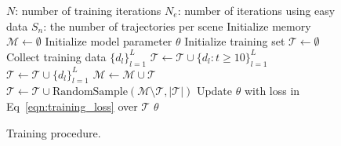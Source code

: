 \begin{wrapfigure}{R}{0.5\textwidth}
\begin{minipage}{0.5\textwidth}
\vspace{-1em}
\begin{algorithm}[H]
\caption{Training procedure.}
\label{alg:training}
\begin{algorithmic}
\State $N$: number of training iterations
\State $N_{e}$: number of iterations using easy data
\State $S_n$: the number of trajectories per scene
\State Initialize memory $\mathcal{M} \leftarrow \emptyset$
\State Initialize model parameter $\theta$
    \State Initialize training set $\mathcal{T} \leftarrow \emptyset$
            \State Collect training data $\{d_l\}_{l=1}^L$
                \State $\mathcal{T} \leftarrow \mathcal{T} \cup \{d_l: t \geq 10\}_{l=1}^L$
            \Else
                \State $\mathcal{T} \leftarrow \mathcal{T} \cup \{d_l\}_{l=1}^L$
            \EndIf
        \EndFor
    \EndFor
    \State $\mathcal{M} \leftarrow \mathcal{M} \cup \mathcal{T}$
    \State $\mathcal{T} \leftarrow \mathcal{T} \cup \text{RandomSample}(\mathcal{M} \setminus \mathcal{T}, |\mathcal{T}|)$
        \State Update $\theta$ with loss in Eq~\eqref{eqn:training_loss} over $\mathcal{T}$
    \EndFor
\EndFor
\State \Return $\theta$
\end{algorithmic}
\end{algorithm}
\vspace{-3em}
\end{minipage}
\end{wrapfigure}

